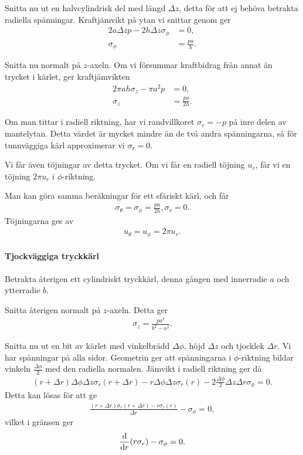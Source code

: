 Snitta nu ut en halvcylindrisk del med längd $\Delta z$, detta för att ej behöva betrakta radiella spänningar. Kraftjämvikt på ytan vi snittar genom ger
\begin{align*}
	2a\Delta zp - 2h\Delta z\sigma_{\phi} &= 0, \\
	\sigma_{\phi}                         &= \frac{pa}{h}.
\end{align*}

Snitta nu normalt på $z$-axeln. Om vi försummar kraftbidrag från annat än trycket i kärlet, ger kraftjämvikten
\begin{align*}
	2\pi ah\sigma_{z} - \pi a^{2}p &= 0, \\
	\sigma_{z}                     &= \frac{pa}{2h}.
\end{align*}

Om man tittar i radiell riktning, har vi randvillkoret $\sigma_{r} = -p$ på inre delen av mantelytan. Detta värdet är mycket mindre än de två andra spänningarna, så för tunnväggiga kärl approximerar vi $\sigma_{r} = 0.$

Vi får även töjningar av detta trycket. Om vi får en radiell töjning $u_{r}$, får vi en töjning $2\pi u_{r}$ i $\phi$-riktning.

Man kan göra samma beräkningar för ett sfäriskt kärl, och får
\begin{align*}
	\sigma_{\theta} = \sigma_{\phi} = \frac{pa}{2h}, \sigma_{r} = 0.
\end{align*}
Töjningarna ges av
\begin{align*}
	u_{\theta} = u_{\phi} = 2\pi u_{r}.
\end{align*}

\paragraph{Tjockväggiga tryckkärl}
Betrakta återigen ett cylindriskt tryckkärl, denna gången med innerradie $a$ och ytterradie $b$.

Snitta återigen normalt på $z$-axeln. Detta ger
\begin{align*}
	\sigma_{z} = \frac{pa^{2}}{b^{2} - a^{2}}.
\end{align*}

Snitta nu ut en bit av kärlet med vinkelbrädd $\Delta\phi$, höjd $\Delta z$ och tjocklek $\Delta r$. Vi har spänningar på alla sidor. Geometrin ger att spänningarna i $\phi$-riktning bildar vinkeln $\frac{\Delta\phi}{2}$ med den radiella normalen. Jämvikt i radiell riktning ger då
\begin{align*}
	(r + \Delta r)\Delta\phi\Delta z\sigma_{r}(r + \Delta r) - r\Delta\phi\Delta z\sigma_{r}(r) - 2\frac{\Delta\phi}{2}\Delta z\Delta r\sigma_{\phi} = 0.
\end{align*}
Detta kan lösas för att ge
\begin{align*}
	\frac{(r + \Delta r)\sigma_{r}(r + \Delta r) - r\sigma_{r}(r)}{\Delta r} - \sigma_{\phi} = 0,
\end{align*}
vilket i gränsen ger
\begin{align*}
	\dv{r}(r\sigma_{r}) - \sigma_{\phi} = 0.
\end{align*}

